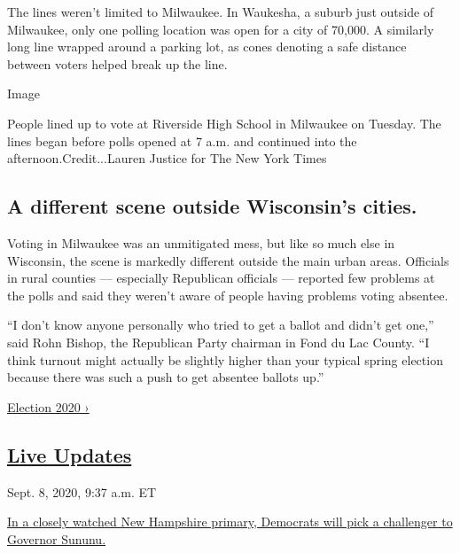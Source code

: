 The lines weren't limited to Milwaukee. In Waukesha, a suburb just
outside of Milwaukee, only one polling location was open for a city of
70,000. A similarly long line wrapped around a parking lot, as cones
denoting a safe distance between voters helped break up the line.

Image

People lined up to vote at Riverside High School in Milwaukee on
Tuesday. The lines began before polls opened at 7 a.m. and continued
into the afternoon.Credit...Lauren Justice for The New York Times

\hypertarget{a-different-scene-outside-wisconsins-cities}{%
\subsection{A different scene outside Wisconsin's
cities.}\label{a-different-scene-outside-wisconsins-cities}}

Voting in Milwaukee was an unmitigated mess, but like so much else in
Wisconsin, the scene is markedly different outside the main urban areas.
Officials in rural counties --- especially Republican officials ---
reported few problems at the polls and said they weren't aware of people
having problems voting absentee.

``I don't know anyone personally who tried to get a ballot and didn't
get one,'' said Rohn Bishop, the Republican Party chairman in Fond du
Lac County. ``I think turnout might actually be slightly higher than
your typical spring election because there was such a push to get
absentee ballots up.''

\href{https://www.nytimes3xbfgragh.onion/news-event/2020-election}{Election
2020 ›}

\hypertarget{live-updates}{%
\subsection{\texorpdfstring{\href{https://www.nytimes3xbfgragh.onion/live/2020/09/08/us/trump-vs-biden}{Live
Updates}}{Live Updates}}\label{live-updates}}

\href{https://www.nytimes3xbfgragh.onion/live/2020/09/08/us/trump-vs-biden\#in-a-closely-watched-new-hampshire-primary-democrats-will-pick-a-challenger-to-governor-sununu}{}

Sept. 8, 2020, 9:37 a.m. ET

\href{https://www.nytimes3xbfgragh.onion/live/2020/09/08/us/trump-vs-biden\#in-a-closely-watched-new-hampshire-primary-democrats-will-pick-a-challenger-to-governor-sununu}{In
a closely watched New Hampshire primary, Democrats will pick a
challenger to Governor
Sununu.}\href{https://www.nytimes3xbfgragh.onion/live/2020/09/08/us/trump-vs-biden\#pence-and-harris-vied-for-wisconsin-a-pivotal-state-in-the-2020-race}{}

